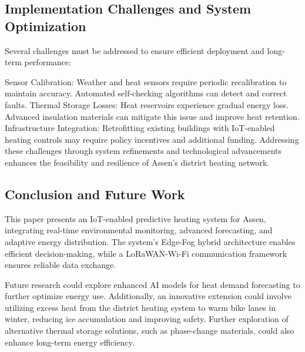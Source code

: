 \documentclass[conference]{IEEEtran}
\begin{document}
\subsection{Implementation Challenges and System Optimization}

Several challenges must be addressed to ensure efficient deployment and long-term performance:

Sensor Calibration: Weather and heat sensors require periodic recalibration to maintain accuracy. Automated self-checking algorithms can detect and correct faults.
Thermal Storage Losses: Heat reservoirs experience gradual energy loss. Advanced insulation materials can mitigate this issue and improve heat retention.
Infrastructure Integration: Retrofitting existing buildings with IoT-enabled heating controls may require policy incentives and additional funding.
Addressing these challenges through system refinements and technological advancements enhances the feasibility and resilience of Assen’s district heating network.

\subsection{Conclusion and Future Work}

This paper presents an IoT-enabled predictive heating system for Assen, integrating real-time environmental monitoring, advanced forecasting, and adaptive energy distribution. The system’s Edge-Fog hybrid architecture enables efficient decision-making, while a LoRaWAN-Wi-Fi communication framework ensures reliable data exchange.

Future research could explore enhanced AI models for heat demand forecasting to further optimize energy use. Additionally, an innovative extension could involve utilizing excess heat from the district heating system to warm bike lanes in winter, reducing ice accumulation and improving safety. Further exploration of alternative thermal storage solutions, such as phase-change materials, could also enhance long-term energy efficiency.



\end{document}

